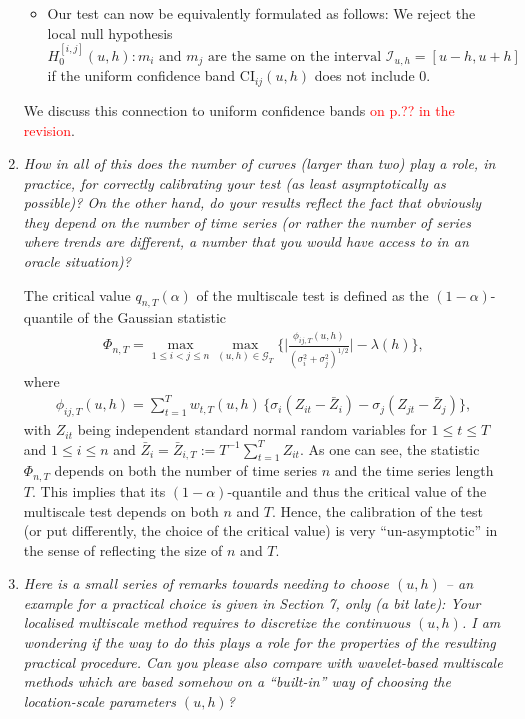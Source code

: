 \documentclass[a4paper,12pt]{article}
\begin{document}
\begin{enumerate}[label=\arabic*.,leftmargin=0.6cm]
\begin{itemize}[leftmargin=0.45cm,itemsep=0pt,topsep=0pt]
\item Our test can now be equivalently formulated as follows: We reject the local null hypothesis
\[ H_0^{[i,j]}(u,h): m_i \text{ and } m_j \text{ are the same on the interval } \mathcal{I}_{u,h} = [u-h,u+h] \]
if the uniform confidence band $\text{CI}_{ij}(u,h)$ does not include $0$. 

\end{itemize} 
We discuss this connection to uniform confidence bands \textcolor{red}{on p.?? in the revision}. 


\item \textit{How in all of this does the number of curves (larger than two) play a role, in practice, for correctly calibrating your test (as least asymptotically as possible)? On the other hand, do your results reflect the fact that obviously they depend on the number of time series (or rather the number of series where trends are different, a number that you would have access to in an oracle situation)?}

The critical value $q_{n,T}(\alpha)$ of the multiscale test is defined as the $(1-\alpha)$-quantile of the Gaussian statistic 
\begin{align}\label{eq:Phi}
\Phi_{n,T} = \max_{1 \le i < j \le n}\max_{(u, h) \in \mathcal{G}_T} \Big\{ \bigg|\frac{\phi_{ij, T}(u, h)}{(\sigma_i^2 + \sigma_j^2)^{1/2}}\bigg| - \lambda(h) \Big\},
\end{align}
where
\begin{align*}
\phi_{ij, T}(u, h) = \sum\limits_{t=1}^T w_{t,T}(u, h) \, \big\{ \sigma_i (Z_{it} - \bar{Z}_i) - \sigma_j (Z_{jt} - \bar{Z}_j) \big\},
\end{align*}
with $Z_{it}$ being independent standard normal random variables for $1 \le t \le T$ and $1 \le i \le n$ and $\bar{Z}_i = \bar{Z}_{i,T} := T^{-1} \sum_{t=1}^T Z_{it}$. As one can see, the statistic $\Phi_{n,T}$ depends on both the number of time series $n$ and the time series length $T$. This implies that its $(1-\alpha)$-quantile and thus the critical value of the multiscale test depends on both $n$ and $T$. Hence, the calibration of the test (or put differently, the choice of the critical value) is very ``un-asymptotic'' in the sense of reflecting the size of $n$ and $T$. 


\item \textit{Here is a small series of remarks towards needing to choose $(u, h)$ -- an example for a practical choice is given in Section 7, only (a bit late): Your localised multiscale method requires to discretize the continuous $(u, h)$. I am wondering if the way to do this plays a role for the properties of the resulting practical procedure. Can you please also compare with wavelet-based multiscale methods which are based somehow on a ``built-in'' way of choosing the location-scale parameters $(u, h)$?}  


\end{enumerate}
\end{document}
